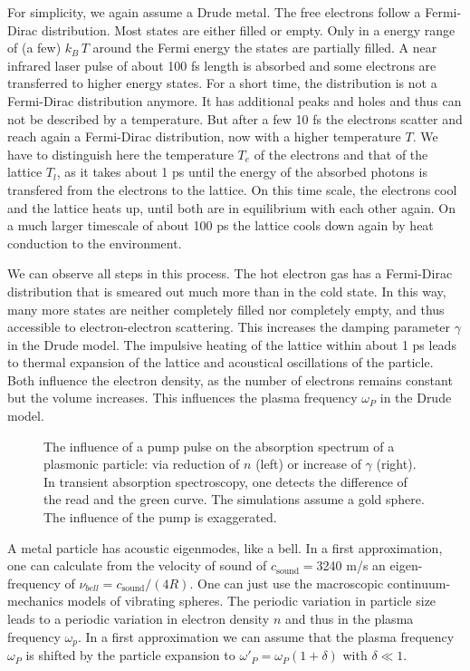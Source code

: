 For simplicity, we again assume a Drude metal. The free electrons follow a Fermi-Dirac distribution. Most states are either filled or empty. Only in a energy range of (a few) $k_B \, T$ around the Fermi energy the states are partially filled. A near infrared laser pulse of about 100 fs length is absorbed and some electrons are transferred to higher energy states. For a short time, the distribution is not a Fermi-Dirac distribution anymore. It has additional peaks and holes and thus can not be described by a temperature. But after a few 10 fs the electrons scatter and reach again a Fermi-Dirac distribution, now with a higher temperature $T$. We have to distinguish here the temperature $T_e$ of the electrons and that of the lattice $T_l$, as it takes about 1 ps until the energy of the absorbed   photons is transfered from the electrons to the lattice. On this time scale, the electrons cool and the lattice heats up, until both are in equilibrium with each other again. On a much larger timescale of about 100 ps the lattice cools down again by heat conduction to the environment.

We can observe all steps in this process. The hot electron gas has a Fermi-Dirac distribution that is smeared out much more than in the cold state. In this way, many more states are neither completely filled nor completely empty, and thus accessible to electron-electron scattering. This increases the damping parameter $\gamma$ in the Drude model.  The impulsive heating of the lattice within about 1 ps leads to thermal expansion of the lattice and acoustical oscillations of the particle. Both influence the electron density, as the number of electrons remains constant but the volume increases. This influences the plasma frequency $\omega_P$ in the Drude model.

\begin{figure}
\caption{The influence of a pump pulse on the absorption spectrum of a plasmonic particle: via reduction of $n$ (left) or increase of $\gamma$ (right). In  transient absorption spectroscopy, one detects the difference of the read and the green curve. The simulations assume a gold sphere. The influence of the pump is exaggerated. \label{fig:hybrid_plasmon_pp_spec}}
\end{figure}

A metal particle has acoustic eigenmodes, like a bell. In a first approximation, one can calculate from the velocity of sound of $c_\text{sound} = $3240 m/s an eigen-frequency of $\nu_{bell} = c_\text{sound} /(4 R)$. One can just use the macroscopic continuum-mechanics models of vibrating spheres. The periodic variation in particle size leads to a periodic variation in electron density $n$ and thus in the plasma frequency $\omega_p$.
In a first approximation we can assume that the plasma frequency
$\omega_P$ is shifted by the particle expansion to $\omega'_P = \omega_P (1 +
\delta)$ with $\delta \ll 1$. 


